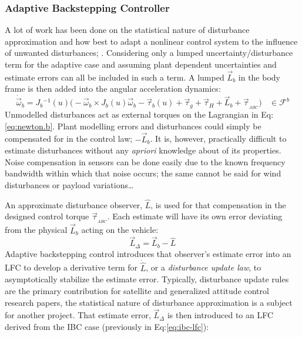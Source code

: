 \subsubsection{Adaptive Backstepping Controller}
\label{subsubsec:control.attitude.nonlinear.adaptivebackstep}
A lot of work has been done on the statistical nature of disturbance approximation and how best to adapt a nonlinear control system to the influence of unwanted disturbances; \cite{nonlineardisturbance,disturbanceadaptivebackstepping,robusttrackingcontrol}. Considering only a lumped uncertainty/disturbance term for the adaptive case and assuming plant dependent uncertainties and estimate errors can all be included in such a term. A lumped $\vec{L}_b$ in the body frame is then added into the angular acceleration dynamics:
\begin{equation}
\dot{\vec{\omega}}_b=J_b\text{}^{-1}(u)\big(-\vec{\omega}_b\times J_b(u)\vec{\omega}_b-\vec{\tau}_b(u)+\vec{\tau}_g+\vec{\tau}_H+\vec{L}_b+\vec{\tau}_{_{ABC}}\big)~~~~\in\mathcal{F}^{b}
\end{equation}
Unmodelled disturbances act as external torques on the Lagrangian in Eq:\ref{eq:newton.b}. Plant modelling errors and disturbances could simply be compensated for in the control law; $-\vec{L}_b$. It is, however, practically difficult to estimate disturbances without any \emph{apriori} knowledge about of its properties. Noise compensation in sensors can be done easily due to the known frequency bandwidth within which that noise occurs; the same cannot be said for wind disturbances or payload variations\ldots
\par
An approximate disturbance observer, $\hat{L}$, is used for that compensation in the designed control torque $\vec{\tau}_{_{ABC}}$. Each estimate will have its own error deviating from the physical $\vec{L}_b$ acting on the vehicle:
\begin{equation}\label{eq:estimate-error}
\vec{L}_\Delta=\vec{L}_b-\hat{L}
\end{equation}
Adaptive backstepping control introduces that observer's estimate error into an LFC to develop a derivative term for $\dot{\hat{L}}$, or a \emph{disturbance update law}, to asymptotically stabilize the estimate error. Typically, disturbance update rules are the primary contribution for satellite and generalized attitude control research papers, the statistical nature of disturbance approximation is a subject for another project. That estimate error, $\vec{L}_\Delta$ is then introduced to an LFC derived from the IBC case (previously in Eq:\ref{eq:ibc-lfc}):
